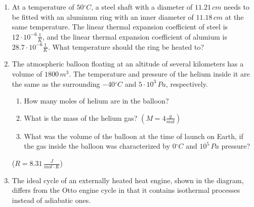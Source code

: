 \documentclass[a4paper,12pt]{letter}
\begin{document}
\begin{enumerate}[label=\Roman*.]
\begin{enumerate}[label=\arabic*.]
  
\item At a temperature of $50{}^{\circ}C$, a steel shaft with a diameter of $11.21\,cm$ needs to be fitted with an aluminum ring with an inner diameter of $11.18\,cm$ at the same temperature. The linear thermal expansion coefficient of steel is $12 \cdot 10^{-6}\frac{1}{K}$, and the linear thermal expansion coefficient of alumium is $28.7 \cdot 10^{-6}\frac{1}{K}$. What temperature should the ring be heated to?

  
\pagebreak
\item The atmospheric balloon floating at an altitude of several kilometers has a volume of $1800\,m^{3}$. The temperature and pressure of the helium inside it are the same as the surrounding $-40{}^{\circ}C$ and $5 \cdot 10^{3}\,Pa$, respectively.
\begin{enumerate}
\item[(a)] How many moles of helium are in the balloon?
\item[(b)] What is the mass of the helium gas? $\left(M = 4 \frac{g}{mol}\right)$
\item[(c)] What was the volume of the balloon at the time of launch on Earth, if the gas inside the balloon was characterized by $0{}^{\circ}C$ and $10^{5}\,Pa$ pressure?
\end{enumerate}
($R=8.31\,\frac{J}{mol\cdot K}$)


\item The ideal cycle of an externally heated heat engine, shown in the diagram, differs from the Otto engine cycle in that it contains isothermal processes instead of adiabatic ones.

\begin{center}
\begin{tikzpicture}[
    arrow inside/.style={
        postaction={decorate},
        decoration={
            markings,
            mark=at position 0.55 with {\arrow{stealth}}
        }
    }
,scale=0.6]


\end{tikzpicture}
\end{center}
\end{enumerate}
\end{enumerate}
\end{document}
